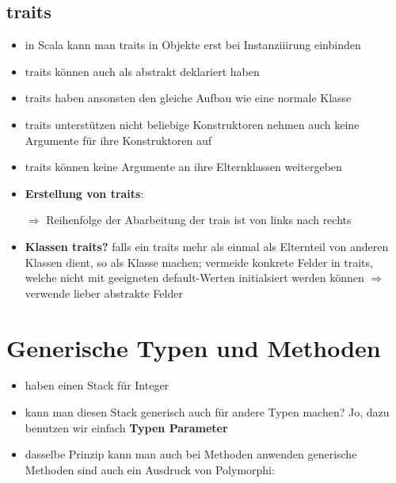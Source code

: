 \subsection{traits}
\begin{itemize}
  \item in Scala kann man traits in Objekte erst bei Instanziiirung einbinden
  \item traits können auch als abstrakt deklariert haben
  \item traits haben ansonsten den gleiche Aufbau wie eine normale
  Klasse
  \item traits unterstützen nicht beliebige Konstruktoren \und nehmen auch
  keine Argumente für ihre Konstruktoren auf
  \item traits können keine Argumente an ihre Elternklassen weitergeben
  \item \textbf{Erstellung von traits}:
  
  
  
  $\Rightarrow$ Reihenfolge der Abarbeitung der trais ist von links nach
  rechts

  \item \textbf{Klassen \oder traits?} falls ein traits mehr als einmal als 
  Elternteil von anderen Klassen dient, so als Klasse machen; vermeide 
  konkrete Felder in traits, welche nicht mit geeigneten default-Werten
  initialsiert werden können $\Rightarrow$ verwende lieber abstrakte Felder
\end{itemize}


\section{Generische Typen und Methoden}
\begin{itemize}
  \item haben einen Stack für Integer
  
  
  
  \item kann man diesen Stack generisch auch für andere Typen machen? Jo, dazu
  benutzen wir einfach \textbf{Typen Parameter}
  
  
  
  \item dasselbe Prinzip kann man auch bei Methoden anwenden \und generische
  Methoden sind auch ein Ausdruck von Polymorphi:
  
  
\end{itemize}


